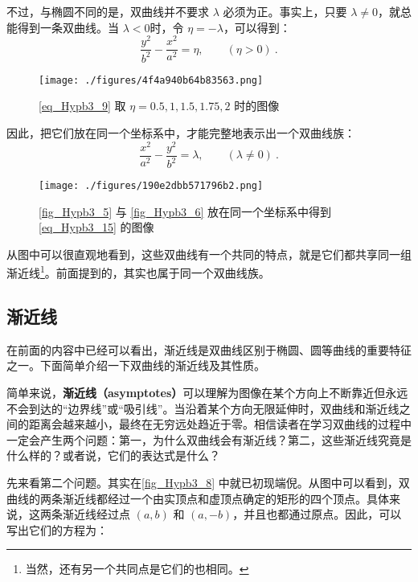 不过，与椭圆不同的是，双曲线并不要求 $\lambda$ 必须为正。事实上，只要 $\lambda\neq0$，就总能得到一条双曲线。当 $\lambda<0$时，令 $\eta=-\lambda$，可以得到：
\begin{equation}\label{eq_Hypb3_9}
\frac{y^2}{b^2}-\frac{x^2}{a^2} = \eta,\qquad(\eta>0)~.
\end{equation}

\begin{figure}[ht]
\centering
\texttt{[image: ./figures/4f4a940b64b83563.png]}
\caption{\autoref{eq_Hypb3_9} 取 $\eta=0.5,1,1.5,1.75,2$ 时的图像} \label{fig_Hypb3_6}
\end{figure}

因此，把它们放在同一个坐标系中，才能完整地表示出一个双曲线族：
\begin{equation}\label{eq_Hypb3_15}
\frac{x^2}{a^2} - \frac{y^2}{b^2} = \lambda,\qquad(\lambda\neq0)~.
\end{equation}

\begin{figure}[ht]
\centering
\texttt{[image: ./figures/190e2dbb571796b2.png]}
\caption{\autoref{fig_Hypb3_5} 与 \autoref{fig_Hypb3_6} 放在同一个坐标系中得到 \autoref{eq_Hypb3_15} 的图像} \label{fig_Hypb3_7}
\end{figure}

从图中可以很直观地看到，这些双曲线有一个共同的特点，就是它们都共享同一组渐近线\footnote{当然，还有另一个共同点是它们的也相同。}。前面提到的，其实也属于同一个双曲线族。

\subsection{渐近线}

在前面的内容中已经可以看出，渐近线是双曲线区别于椭圆、圆等曲线的重要特征之一。下面简单介绍一下双曲线的渐近线及其性质。

简单来说，\textbf{渐近线（asymptotes）}可以理解为图像在某个方向上不断靠近但永远不会到达的“边界线”或“吸引线”。当沿着某个方向无限延伸时，双曲线和渐近线之间的距离会越来越小，最终在无穷远处趋近于零。相信读者在学习双曲线的过程中一定会产生两个问题：第一，为什么双曲线会有渐近线？第二，这些渐近线究竟是什么样的？或者说，它们的表达式是什么？

先来看第二个问题。其实在\autoref{fig_Hypb3_8} 中就已初现端倪。从图中可以看到，双曲线的两条渐近线都经过一个由实顶点和虚顶点确定的矩形的四个顶点。具体来说，这两条渐近线经过点 $(a,b)$ 和 $(a,-b)$，并且也都通过原点。因此，可以写出它们的方程为：


